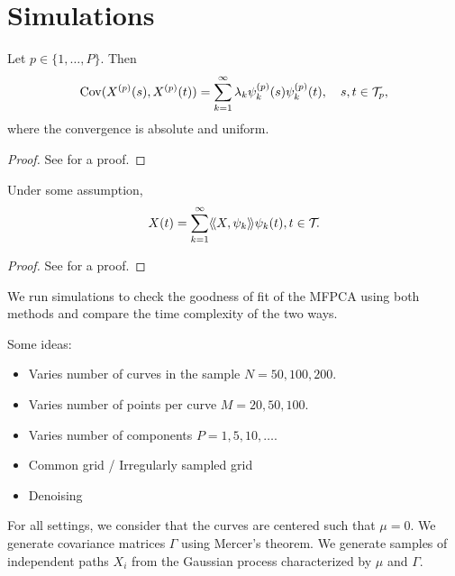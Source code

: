 \section{Simulations} %
\label{sec:simulations}

\begin{theorem}\label{th:mercer_th}
Let $p \in \{1, \dots, P\}$. Then
\begin{equation}
    \operatorname{Cov}(X^{(p)}(s), X^{(p)}(t)) = \sum_{k = 1}^\infty \lambda_k \psi_k^{(p)}(s)\psi_k^{(p)}(t), \quad s, t \in \mathcal{T}_{p},
\end{equation}
where the convergence is absolute and uniform.
\end{theorem}
\begin{proof}
    See \cite{happMultivariateFunctionalPrincipal2015} for a proof.
\end{proof}

\begin{theorem}\label{th:kl_th}
    Under some assumption,
\begin{equation}
    X(t) = \sum_{k = 1}^\infty \langle\!\langle X, \psi_k\rangle\!\rangle\psi_k(t), t \in \mathcal{T}_{}.
\end{equation}
\end{theorem}
\begin{proof}
    See \cite{happMultivariateFunctionalPrincipal2015} for a proof.
\end{proof}


We run simulations to check the goodness of fit of the MFPCA using both methods and compare the time complexity of the two ways. 

Some ideas:
\begin{itemize}
    \item Varies number of curves in the sample $N = 50, 100, 200$.
    \item Varies number of points per curve $M = 20, 50, 100$.
    \item Varies number of components $P = 1, 5, 10, \dots$.
    \item Common grid / Irregularly sampled grid
    \item Denoising
\end{itemize}

For all settings, we consider that the curves are centered such that $\mu = 0$. We generate covariance matrices $\Gamma$ using Mercer's theorem. We generate samples of independent paths $X_i$ from the Gaussian process characterized by $\mu$ and $\Gamma$.

